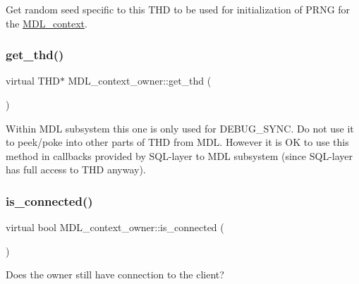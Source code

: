 Get random seed specific to this T\+HD to be used for initialization of P\+R\+NG for the \mbox{\hyperlink{classMDL__context}{M\+D\+L\+\_\+context}}. \mbox{\label{classMDL__context__owner_a6e93b957e332a9811d4a2d4195bd3e21}} 
\subsubsection{\texorpdfstring{get\+\_\+thd()}{get\_thd()}}
{\footnotesize\ttfamily virtual T\+HD$\ast$ M\+D\+L\+\_\+context\+\_\+owner\+::get\+\_\+thd (\begin{DoxyParamCaption}{ }\end{DoxyParamCaption})\hspace{0.3cm}{\ttfamily [pure virtual]}}

Within M\+DL subsystem this one is only used for D\+E\+B\+U\+G\+\_\+\+S\+Y\+NC. Do not use it to peek/poke into other parts of T\+HD from M\+DL. However it is OK to use this method in callbacks provided by S\+QL-\/layer to M\+DL subsystem (since S\+QL-\/layer has full access to T\+HD anyway). \mbox{\label{classMDL__context__owner_a189aa48c8373e98fcc412290c92226a8}} 
\subsubsection{\texorpdfstring{is\+\_\+connected()}{is\_connected()}}
{\footnotesize\ttfamily virtual bool M\+D\+L\+\_\+context\+\_\+owner\+::is\+\_\+connected (\begin{DoxyParamCaption}{ }\end{DoxyParamCaption})\hspace{0.3cm}{\ttfamily [pure virtual]}}

Does the owner still have connection to the client? \mbox{\label{classMDL__context__owner_aa38a69293832e50edb8c194b0fc1c6e9}} 

